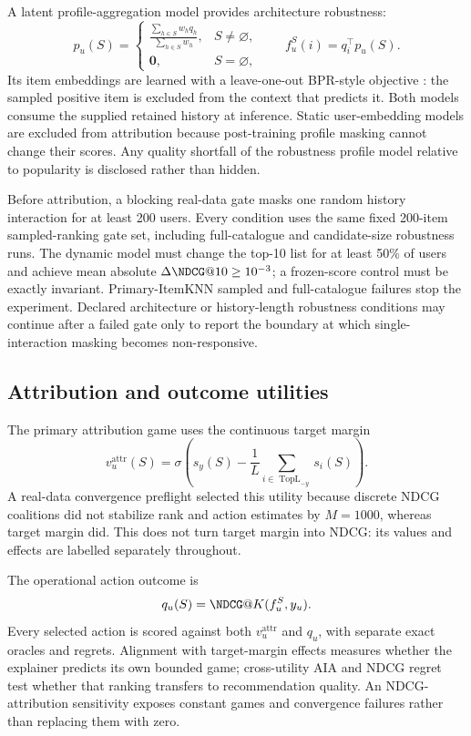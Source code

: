 \documentclass[11pt]{article}
\begin{document}
A latent profile-aggregation model provides architecture robustness:
\begin{equation}
p_u(S)=
\begin{cases}
\displaystyle\frac{\sum_{h\in S}w_hq_h}{\sum_{h\in S}w_h},&S\ne\varnothing,\\[6pt]
\mathbf 0,&S=\varnothing,
\end{cases}
\qquad f_u^S(i)=q_i^\top p_u(S).
\end{equation}
Its item embeddings are learned with a leave-one-out BPR-style objective \citep{rendle2009}: the sampled positive item is excluded from the context that predicts it. Both models consume the supplied retained history at inference. Static user-embedding models are excluded from attribution because post-training profile masking cannot change their scores. Any quality shortfall of the robustness profile model relative to popularity is disclosed rather than hidden.

Before attribution, a blocking real-data gate masks one random history interaction for at least 200 users. Every condition uses the same fixed 200-item sampled-ranking gate set, including full-catalogue and candidate-size robustness runs. The dynamic model must change the top-10 list for at least 50\% of users and achieve mean absolute $\Delta\NDCG@10\ge10^{-3}$; a frozen-score control must be exactly invariant. Primary-ItemKNN sampled and full-catalogue failures stop the experiment. Declared architecture or history-length robustness conditions may continue after a failed gate only to report the boundary at which single-interaction masking becomes non-responsive.

\subsection{Attribution and outcome utilities}
The primary attribution game uses the continuous target margin
\begin{equation}
v_u^{\mathrm{attr}}(S)=\sigma\!\left(s_y(S)-\frac{1}{L}\sum_{i\in\operatorname{TopL}_{-y}}s_i(S)\right).
\end{equation}
A real-data convergence preflight selected this utility because discrete NDCG coalitions did not stabilize rank and action estimates by $M=1000$, whereas target margin did. This does not turn target margin into NDCG: its values and effects are labelled separately throughout.

The operational action outcome is
\begin{equation}
q_u(S)=\NDCG@K(f_u^S,y_u).
\end{equation}
Every selected action is scored against both $v_u^{\mathrm{attr}}$ and $q_u$, with separate exact oracles and regrets. Alignment with target-margin effects measures whether the explainer predicts its own bounded game; cross-utility AIA and NDCG regret test whether that ranking transfers to recommendation quality. An NDCG-attribution sensitivity exposes constant games and convergence failures rather than replacing them with zero.
\end{document}
